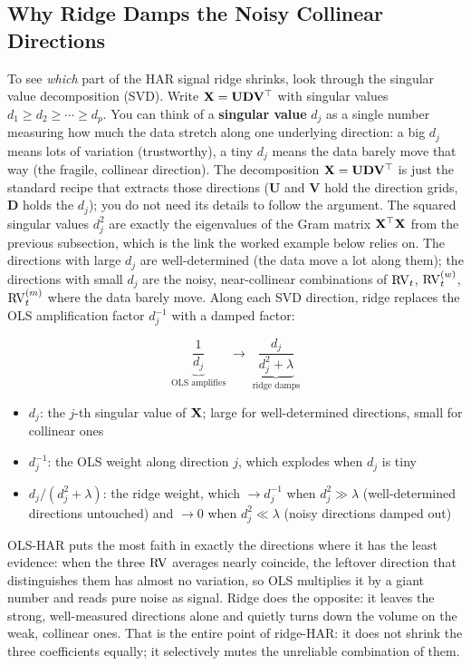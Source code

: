 \subsection{Why Ridge Damps the Noisy Collinear Directions}

To see \emph{which} part of the HAR signal ridge shrinks, look through the singular value decomposition (SVD).
Write $\mathbf{X} = \mathbf{U}\mathbf{D}\mathbf{V}^\top$ with singular values $d_1 \geq d_2 \geq \cdots \geq d_p$.
You can think of a \textbf{singular value} $d_j$ as a single number measuring how much the data stretch along one underlying direction: a big $d_j$ means lots of variation (trustworthy), a tiny $d_j$ means the data barely move that way (the fragile, collinear direction).
The decomposition $\mathbf{X} = \mathbf{U}\mathbf{D}\mathbf{V}^\top$ is just the standard recipe that extracts those directions ($\mathbf{U}$ and $\mathbf{V}$ hold the direction grids, $\mathbf{D}$ holds the $d_j$); you do not need its details to follow the argument.
The squared singular values $d_j^2$ are exactly the eigenvalues of the Gram matrix $\mathbf{X}^\top\mathbf{X}$ from the previous subsection, which is the link the worked example below relies on.
The directions with large $d_j$ are well-determined (the data move a lot along them); the directions with small $d_j$ are the noisy, near-collinear combinations of $\operatorname{RV}_t$, $\operatorname{RV}^{(w)}_t$, $\operatorname{RV}^{(m)}_t$ where the data barely move.
Along each SVD direction, ridge replaces the OLS amplification factor $d_j^{-1}$ with a damped factor:

\begin{equation}
  \underbrace{\frac{1}{d_j}}_{\text{OLS amplifies}}
  \;\longrightarrow\;
  \underbrace{\frac{d_j}{d_j^2 + \lambda}}_{\text{ridge damps}}
  \label{eq:ridge-svd-shrinkage}
\end{equation}
\begin{itemize}[nosep]
  \item $d_j$: the $j$-th singular value of $\mathbf{X}$; large for well-determined directions, small for collinear ones
  \item $d_j^{-1}$: the OLS weight along direction $j$, which explodes when $d_j$ is tiny
  \item $d_j/(d_j^2+\lambda)$: the ridge weight, which $\to d_j^{-1}$ when $d_j^2 \gg \lambda$ (well-determined directions untouched) and $\to 0$ when $d_j^2 \ll \lambda$ (noisy directions damped out)
\end{itemize}

\begin{intuition}
OLS-HAR puts the most faith in exactly the directions where it has the least evidence: when the three $\operatorname{RV}$ averages nearly coincide, the leftover direction that distinguishes them has almost no variation, so OLS multiplies it by a giant number and reads pure noise as signal.
Ridge does the opposite: it leaves the strong, well-measured directions alone and quietly turns down the volume on the weak, collinear ones.
That is the entire point of ridge-HAR: it does not shrink the three coefficients equally; it selectively mutes the unreliable combination of them.
\end{intuition}

